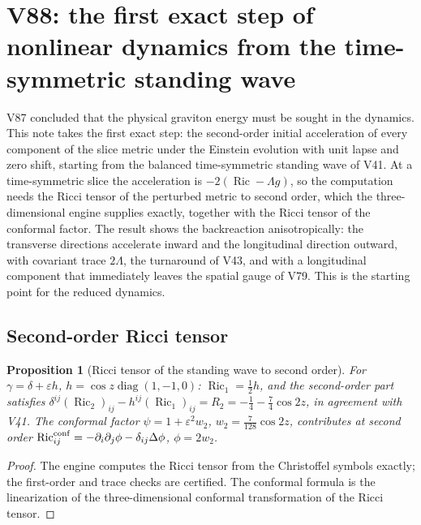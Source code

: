 \documentclass[11pt]{article}
\newtheorem{proposition}[theorem]{Proposition}
\theoremstyle{remark}
\begin{document}
\section{V88: the first exact step of nonlinear dynamics from the time-symmetric standing wave}
\label{sec:v19v88}

V87 concluded that the physical graviton energy must be sought in the
dynamics.  This note takes the first exact step: the second-order
initial acceleration of every component of the slice metric under the
Einstein evolution with unit lapse and zero shift, starting from the
balanced time-symmetric standing wave of V41.  At a time-symmetric
slice the acceleration is \(-2(\operatorname{Ric}-\Lambda g)\), so the
computation needs the Ricci tensor of the perturbed metric to second
order, which the three-dimensional engine supplies exactly, together
with the Ricci tensor of the conformal factor.  The result shows the
backreaction anisotropically: the transverse directions accelerate
inward and the longitudinal direction outward, with covariant trace
\(2\Lambda\), the turnaround of V43, and with a longitudinal component
that immediately leaves the spatial gauge of V79.  This is the
starting point for the reduced dynamics.

\subsection{Second-order Ricci tensor}

\begin{proposition}[Ricci tensor of the standing wave to second order]
\label{prop:v19v88-ricci}
For \(\gamma=\delta+\varepsilon h\), \(h=\cos z\operatorname{diag}(1,-1,0)\):
\(\operatorname{Ric}_1=\tfrac12h\), and the second-order part satisfies
\(\delta^{ij}(\operatorname{Ric}_2)_{ij}-h^{ij}(\operatorname{Ric}_1)_{ij}=R_2=-\tfrac14-\tfrac74\cos2z\),
in agreement with V41.  The conformal factor \(\psi=1+\varepsilon^2w_2\),
\(w_2=\tfrac7{128}\cos2z\), contributes at second order
\(\operatorname{Ric}^{\rm conf}_{ij}=-\partial_i\partial_j\phi-\delta_{ij}\Delta\phi\),
\(\phi=2w_2\).
\end{proposition}

\begin{proof}
The engine computes the Ricci tensor from the Christoffel symbols
exactly; the first-order and trace checks are certified.  The
conformal formula is the linearization of the three-dimensional
conformal transformation of the Ricci tensor.
\end{proof}
\end{document}
